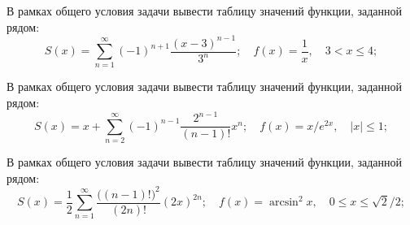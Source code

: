 \begin{zztask}
В рамках общего условия задачи вывести таблицу значений функции, заданной рядом:
\[
  S(x)= \sum_{n=1}^\infty (-1)^{n+1}\frac{(x-3)^{n-1}}{3^n};\quad
  f(x)= \frac{1}{x},
  \quad 3 < x \leq 4;
\]
\end{zztask}


\begin{zztask}
В рамках общего условия задачи вывести таблицу значений функции, заданной рядом:
\[
  S(x)= x + \sum_{n=2}^\infty (-1)^{n-1}\frac{2^{n-1}}{(n-1)!} x^n;\quad
  f(x)= x/e^{2x},
  \quad |x| \leq 1;
\]
\end{zztask}


\begin{zztask}
В рамках общего условия задачи вывести таблицу значений функции, заданной рядом:
\[
  S(x)= \frac{1}{2} \sum_{n=1}^\infty \frac{\big((n-1)!\big)^2}{(2n)!} (2x)^{2n};\quad
  f(x)= \arcsin^2x,
  \quad 0 \leq x \leq \sqrt2/2;
\]
\end{zztask}

